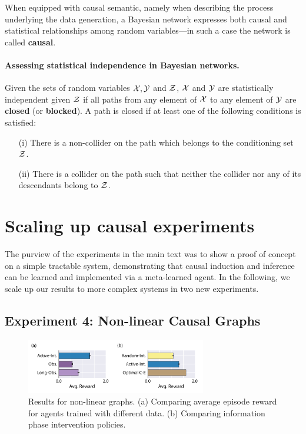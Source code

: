 When equipped with causal semantic, namely when describing the process underlying the data generation, a Bayesian network expresses both causal and statistical relationships among random variables---in such a case the network is called {\bf causal}.  

\paragraph{Assessing statistical independence in Bayesian networks.}
Given the sets of random variables ${\cal X}, {\cal Y}$ and ${\cal Z}$,
${\cal X}$ and ${\cal Y}$ are statistically independent given ${\cal Z}$ if all paths
from any element of ${\cal X}$ to any element of ${\cal Y}$ are {\bf closed} (or {\bf blocked}). A path is closed if at least one of the following conditions is satisfied:
\begin{enumerate}
\setlength{\itemsep}{-2pt}  
\setlength{\parsep}{-4pt}
\item[(i)] There is a non-collider on the path which belongs to the conditioning set ${\cal Z}$.
\item[(ii)] There is a collider on the path such that neither the collider nor any of its descendants belong to ${\cal Z}$.
\end{enumerate}

\section{Scaling up causal experiments}
\label{app:causal_addexpt}

The purview of the experiments in the main text was to show a proof of concept on a simple tractable system, demonstrating that causal induction and inference can be learned and implemented via a meta-learned agent. In the following, we scale up our results to more complex systems in two new experiments.

\subsection{Experiment 4: Non-linear Causal Graphs}

\begin{figure}[ht!]
\centering
\includegraphics[width=0.7\textwidth]{figures/Nonlinear_results.pdf} 
\caption{Results for non-linear graphs. (a) Comparing average episode reward for agents trained with different data. (b) Comparing information phase intervention policies. }
\label{fig:nonlinear_results}
\end{figure}

